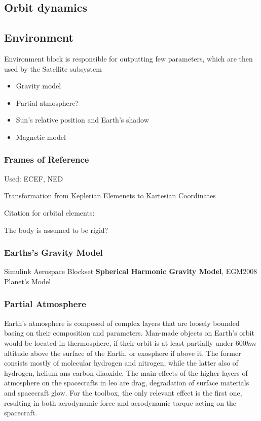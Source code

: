 \subsection{Orbit dynamics}

\subsection{Environment}
    Environment block is responsible for outputting few parameters, which are then used by the Satellite subsystem
    \begin{itemize}
        \item Gravity model
        \item Partial atmosphere?
        \item Sun's relative position and Earth's shadow
        \item Magnetic model
    \end{itemize}

    \subsubsection{Frames of Reference}
        Used: ECEF, NED

        Transformation from Keplerian Elemenets to Kartesian Coordinates


    Citation for orbital elements: \cite{vallado2001fundamentals}

    The body is assumed to be rigid?

    \subsubsection{Earths's Gravity Model}
        Simulink Aerospace Blockset \textbf{Spherical Harmonic Gravity Model}, EGM2008 Planet's Model


    \subsubsection{Partial Atmosphere}
        Earth's atmosphere is composed of complex layers that are loosely bounded basing on their composition and parameters. Man-made objects on Earth's orbit would be located in thermosphere, if their orbit is at least partially under $600km$ altitude above the surface of the Earth, or exosphere if above it. The former consists mostly of molecular hydrogen and nitrogen, while the latter also of hydrogen, helium ans carbon diaoxide. The main effects of the higher layers of atmosphere on the spacecrafts in \ac{leo} are drag, degradation of surface materials and spacecraft glow. For the toolbox, the only relevant effect is the first one, resulting in both aerodynamic force and aerodynamic torque acting on the spacecraft.

